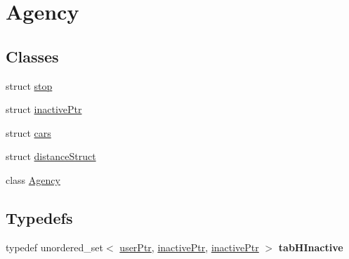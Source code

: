 \hypertarget{group___agency}{}\section{Agency}
\label{group___agency}
\subsection*{Classes}
\begin{DoxyCompactItemize}
\item 
struct \hyperlink{structstop}{stop}
\item 
struct \hyperlink{structinactive_ptr}{inactive\+Ptr}
\item 
struct \hyperlink{structcars}{cars}
\item 
struct \hyperlink{structdistance_struct}{distance\+Struct}
\item 
class \hyperlink{class_agency}{Agency}
\end{DoxyCompactItemize}
\subsection*{Typedefs}
\begin{DoxyCompactItemize}
\item 
\mbox{\label{group___agency_gac4e50fb3eb9c87ffa6e32341378b4af6}} 
typedef unordered\+\_\+set$<$ \hyperlink{structuser_ptr}{user\+Ptr}, \hyperlink{structinactive_ptr}{inactive\+Ptr}, \hyperlink{structinactive_ptr}{inactive\+Ptr} $>$ {\bfseries tab\+H\+Inactive}
\end{DoxyCompactItemize}
